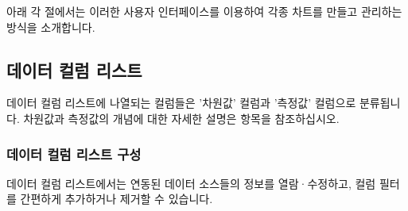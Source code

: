 \documentclass[letterpaper,10pt,english]{sphinxmanual}
\begin{document}
아래 각 절에서는 이러한 사용자 인터페이스를 이용하여 각종 차트를 만들고 관리하는 방식을 소개합니다.


\subsection{데이터 컬럼 리스트}
\label{\detokenize{discovery/part04/composition_of_the_data_column_list:id1}}\label{\detokenize{discovery/part04/composition_of_the_data_column_list::doc}}
데이터 컬럼 리스트에 나열되는 컬럼들은 '차원값' 컬럼과 '측정값' 컬럼으로 분류됩니다. 차원값과 측정값의 개념에 대한 자세한 설명은 {\hyperref[\detokenize{discovery/part02/dimension_and_measures::doc}]{}} 항목을 참조하십시오.


\subsubsection{데이터 컬럼 리스트 구성}
\label{\detokenize{discovery/part04/composition_of_the_data_column_list:id2}}
데이터 컬럼 리스트에서는 연동된 데이터 소스들의 정보를 열람·수정하고, 컬럼 필터를 간편하게 추가하거나 제거할 수 있습니다.
\end{document}
